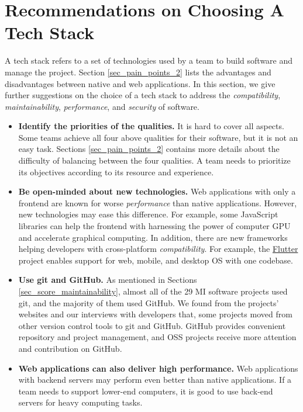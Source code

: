 \section{Recommendations on Choosing A Tech Stack}
\label{sec_recommendations_tech_stack}

A tech stack refers to a set of technologies used by a team to build software and manage the project. Section \ref{sec_pain_points_2} lists the advantages and disadvantages between native and web applications. In this section, we give further suggestions on the choice of a tech stack to address the \textit{compatibility}, \textit{maintainability}, \textit{performance}, and \textit{security} of software.

\begin{itemize}
\item \textbf{Identify the priorities of the qualities.} It is hard to cover all aspects. Some teams achieve all four above qualities for their software, but it is not an easy task. Sections \ref{sec_pain_points_2} contains more details about the difficulty of balancing between the four qualities. A team needs to prioritize its objectives according to its resource and experience.

\item \textbf{Be open-minded about new technologies.} Web applications with only a frontend are known for worse \textit{performance} than native applications. However, new technologies may ease this difference. For example, some JavaScript libraries can help the frontend with harnessing the power of computer GPU and accelerate graphical computing. In addition, there are new frameworks helping developers with cross-platform \textit{compatibility}. For example, the \hyperlink{https://flutter.dev/}{Flutter} project enables support for web, mobile, and desktop OS with one codebase.

\item \textbf{Use git and GitHub.} 
As mentioned in Sections \ref{sec_score_maintainability}, almost all of the 29 MI software projects used git, and the majority of them used GitHub. We found from the projects' websites and our interviews with developers that, some projects moved from other version control tools to git and GitHub. GitHub provides convenient repository and project management, and OSS projects receive more attention and contribution on
GitHub.

\item \textbf{Web applications can also deliver high performance.} Web applications with backend servers may perform even better than native applications. If a team needs to support lower-end computers, it is good to use back-end servers for heavy computing tasks.


\end{itemize}

